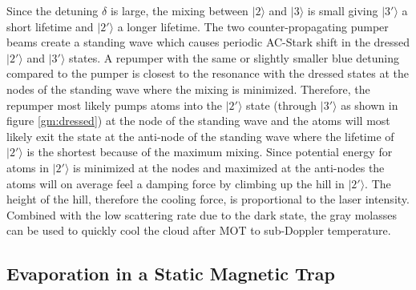 Since the detuning $\delta$ is large, the mixing between $|2\rangle$ and $|3\rangle$ is small giving $|3'\rangle$ a short lifetime and $|2'\rangle$ a longer lifetime. The two counter-propagating pumper beams create a standing wave which causes periodic AC-Stark shift in the dressed $|2'\rangle$ and $|3'\rangle$ states. A repumper with the same or slightly smaller blue detuning compared to the pumper is closest to the resonance with the dressed states at the nodes of the standing wave where the mixing is minimized. Therefore, the repumper most likely pumps atoms into the $|2'\rangle$ state (through $|3'\rangle$ as shown in figure \ref{gm:dressed}) at the node of the standing wave and the atoms will most likely exit the state at the anti-node of the standing wave where the lifetime of $|2'\rangle$ is the shortest because of the maximum mixing. Since potential energy for atoms in $|2'\rangle$ is minimized at the nodes and maximized at the anti-nodes the atoms will on average feel a damping force by climbing up the hill in $|2'\rangle$. The height of the hill, therefore the cooling force, is proportional to the laser intensity. Combined with the low scattering rate due to the dark state, the gray molasses can be used to quickly cool the cloud after MOT to sub-Doppler temperature.

\subsection{Evaporation in a Static Magnetic Trap}\label{theory:mt}

